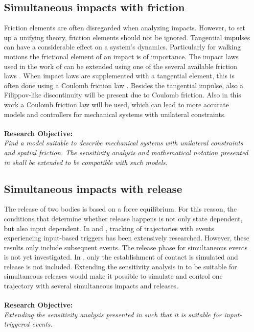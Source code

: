 \documentclass[../DC2017114Bouma.tex]{subfiles}
\begin{document}
\subsection*{Simultaneous impacts with friction}
Friction elements are often disregarded when analyzing impacts. However, to set up a unifying theory, friction elements should not be ignored. Tangential impulses can have a considerable effect on a system's dynamics. Particularly for walking motions the frictional element of an impact is of importance. The impact laws used in the work of \cite{Chen2018a} can be extended using one of the several available friction laws \cite{Leine2008}. When impact laws are supplemented with a tangential element, this is often done using a Coulomb friction law \cite{Glocker2014a}. Besides the tangential impulse, also a Filippov-like discontinuity will be present due to Coulomb friction. Also in this work a Coulomb friction law will be used, which can lead to more accurate models and controllers for mechanical systems with unilateral constraints.\\\\
\textbf{Research Objective:}\\
\textit{Find a model suitable to describe mechanical systems with unilateral constraints and spatial friction. The sensitivity analysis and mathematical notation presented in \cite{Chen2018a} shall be extended to be compatible with such models.}

\subsection*{Simultaneous impacts with release}
The release of two bodies is based on a force equilibrium. For this reason, the conditions that determine whether release happens is not only state dependent, but also input dependent. In \cite{Rijnen2016} and \cite{Rijn2016}, tracking of trajectories with events experiencing input-based triggers has been extensively researched. However, these results only include subsequent events. The release phase for simultaneous events is not yet investigated. In \cite{Chen2018a}, only the establishment of contact is simulated and release is not included. Extending the sensitivity analysis in \cite{Chen2018a} to be suitable for simultaneous releases would make it possible to simulate and control one trajectory with several simultaneous impacts and releases.\\\\
\textbf{Research Objective:}\\
\textit{Extending the sensitivity analysis presented in \cite{Chen2018a} such that it is suitable for input-triggered events.}
\end{document}
